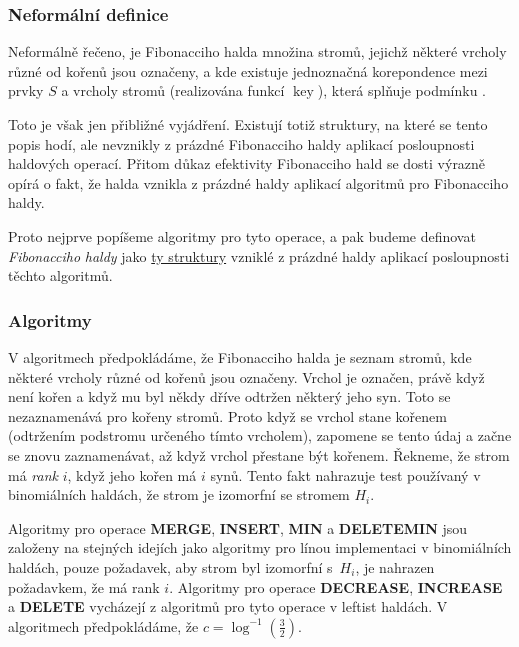 \documentclass[a4paper,12pt]{article}
\DeclareMathOperator*{\key}{key}
\begin{document}
\subsubsection{Neformální definice}
Neformálně řečeno, je Fibonacciho halda množina 
stromů, jejichž některé vrcholy různé od 
kořenů jsou označeny, a kde existuje 
jednoznačná korepondence mezi prvky $S$ a vrcholy 
stromů (realizována funkcí $\key$), která splňuje 
podmínku .  

Toto je však jen přibliž\-né 
vyjádření.  Existují totiž struktury, na které se tento 
popis hodí, ale 
nevznikly z prázd\-né Fibonacciho haldy aplikací 
posloupnosti haldových  
operací.  Přitom důkaz efekti\-vity Fibonacciho hald se 
dosti výrazně opírá o fakt, že halda vznikla z prázdné 
haldy aplikací algoritmů pro Fibonacciho 
haldy. 

Proto nejprve popíšeme algoritmy pro tyto 
ope\-race, a pak budeme
definovat \emph{Fibonacciho} \emph{haldy} jako \underline{ty struktury} 
vzniklé z prázdné haldy aplikací posloupnosti 
těchto algoritmů.

\subsubsection{Algoritmy}

V algoritmech předpokládáme, že Fibonacciho halda je 
seznam stromů, kde některé vrcholy různé od 
kořenů jsou označeny.  Vrchol je označen, právě když není 
kořen a když mu byl někdy dříve odtržen některý jeho syn. Toto se 
nezaznamenává pro kořeny stromů. Proto když se 
vrchol stane kořenem (odtržením podstromu určeného 
tímto vrcholem),  
zapomene  se tento údaj a začne se znovu zaznamenávat, 
až když vrchol přestane 
být kořenem. Řekneme, že strom má \emph{rank} $i$, když 
jeho kořen 
má $i$ synů. Tento fakt nahrazuje test používaný 
v binomiálních 
haldách, že strom je izomorfní se stromem $H_i$. 

Algoritmy pro operace {\bf MERGE}, {\bf INSERT}, {\bf MIN} a 
{\bf DELE\-TEMIN} jsou založeny na stejných idejích jako algoritmy pro línou implementaci 
v binomiálních haldách, pouze poža\-da\-vek, aby strom byl 
izomorfní s~$H_i$, je nahrazen požadavkem, že má rank $
i$. 
Algoritmy pro ope\-race {\bf DECREASE}, {\bf INCREASE} a {\bf DELETE }
vycházejí z algoritmů pro tyto operace v leftist 
haldách. V algoritmech předpokládáme, že $c=\log^{-1}
(\frac 32)$.
\end{document}

